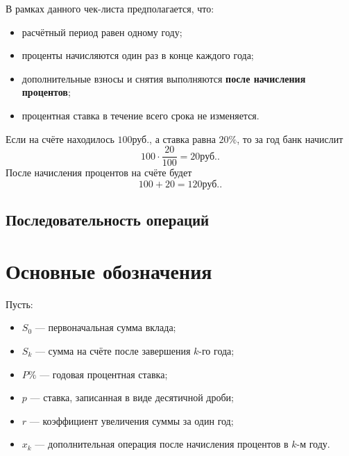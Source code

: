 \documentclass[a4paper,12pt]{article}
\newcommand{\RUB}{\text{руб.}}
\newcommand{\important}[1]{\textbf{\color{darkaccent}#1}}
\begin{document}
В рамках данного чек-листа предполагается, что:

\begin{itemize}
  \item расчётный период равен одному году;
  \item проценты начисляются один раз в конце каждого года;
  \item дополнительные взносы и снятия выполняются \important{после начисления процентов};
  \item процентная ставка в течение всего срока не изменяется.
\end{itemize}

Если на счёте находилось \(100\RUB\), а ставка равна \(20\%\), то за год банк
начислит
\[
100\cdot\frac{20}{100}=20\RUB.
\]
После начисления процентов на счёте будет
\[
100+20=120\RUB.
\]

\subsection{Последовательность операций}

\begin{center}
\end{center}

\section{Основные обозначения}

Пусть:

\begin{itemize}
  \item \(S_0\) --- первоначальная сумма вклада;
  \item \(S_k\) --- сумма на счёте после завершения \(k\)-го года;
  \item \(P\%\) --- годовая процентная ставка;
  \item \(p\) --- ставка, записанная в виде десятичной дроби;
  \item \(r\) --- коэффициент увеличения суммы за один год;
  \item \(x_k\) --- дополнительная операция после начисления процентов
  в \(k\)-м году.
\end{itemize}
\end{document}
